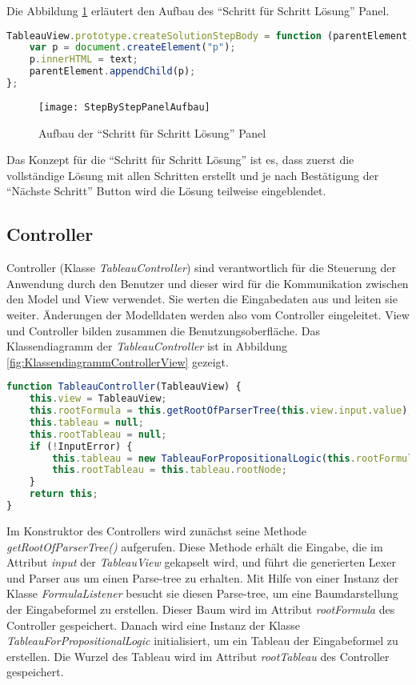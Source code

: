 Die Abbildung \ref{fig:StepByStepPanelAufbau} erläutert den Aufbau des ``Schritt für Schritt Lösung'' Panel.
\begin{lstlisting}[language=JavaScript, caption= createSolutionStepBody() (Klasse TableauView), basicstyle=\scriptsize] 
TableauView.prototype.createSolutionStepBody = function (parentElement, text) {
    var p = document.createElement("p");
    p.innerHTML = text;
    parentElement.appendChild(p);
};
\end{lstlisting}

\begin{figure}[ !h] \centering
\texttt{[image: StepByStepPanelAufbau]}
\caption[Aufbau der StepByStepPanel]{Aufbau der ``Schritt für Schritt Lösung'' Panel}\label{fig:StepByStepPanelAufbau}
\end{figure}

Das Konzept für die ``Schritt für Schritt Lösung'' ist es, dass zuerst die vollständige Lösung mit allen Schritten erstellt und je nach Bestätigung der ``Nächste Schritt'' Button wird die Lösung teilweise eingeblendet.

\subsection{Controller}\label{subsec:Controller}

Controller (Klasse \textit{TableauController}) sind verantwortlich für die Steuerung der Anwendung durch den Benutzer und dieser wird für die Kommunikation zwischen den Model und View verwendet. Sie werten die Eingabedaten aus und leiten sie weiter. Änderungen der Modelldaten werden also vom Controller eingeleitet. View und Controller bilden zusammen die Benutzungsoberfläche. Das Klassendiagramm der \textit{TableauController} ist in Abbildung \ref{fig:KlassendiagrammControllerView} gezeigt.

\begin{lstlisting}[language=JavaScript, caption= TableauController Konstruktor, basicstyle=\scriptsize] 
function TableauController(TableauView) {
    this.view = TableauView;
    this.rootFormula = this.getRootOfParserTree(this.view.input.value);
    this.tableau = null;
    this.rootTableau = null;
    if (!InputError) {
        this.tableau = new TableauForPropositionalLogic(this.rootFormula);
        this.rootTableau = this.tableau.rootNode;
    }
    return this;
}
\end{lstlisting}

Im Konstruktor des Controllers wird zunächst seine Methode \textit{getRootOfParserTree()} aufgerufen. Diese Methode erhält die Eingabe, die im Attribut \textit{input} der \textit{TableauView} gekapselt wird, und führt die generierten Lexer und Parser aus um einen Parse-tree zu erhalten. Mit Hilfe von einer Instanz der Klasse  \textit{FormulaListener} besucht sie diesen Parse-tree, um eine Baumdarstellung der Eingabeformel zu erstellen. Dieser Baum wird im Attribut \textit{rootFormula} des Controller gespeichert. Danach wird eine Instanz der Klasse \textit{TableauForPropositionalLogic} initialisiert, um ein Tableau der Eingabeformel zu erstellen. Die Wurzel des Tableau wird im Attribut \textit{rootTableau} des Controller gespeichert.

